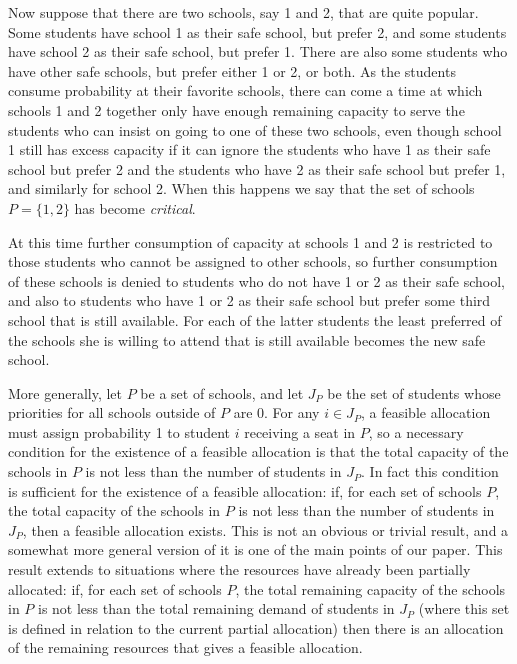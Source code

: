 \documentclass[12pt]{article}
\theoremstyle{definition}
\begin{document}
Now suppose that there are two schools, say 1 and 2, that are quite
popular.  Some students have school 1 as their safe school, but prefer
2, and some students have school 2 as their safe school, but prefer 1.
There are also some students who have other safe schools, but prefer
either 1 or 2, or both.  As the students consume probability at their
favorite schools, there can come a time at which schools 1 and 2
together only have enough remaining capacity to serve the students who
can insist on going to one of these two schools, even though school 1
still has excess capacity if it can ignore the students who have 1 as
their safe school but prefer 2 and the students who have 2 as their
safe school but prefer 1, and similarly for school 2.  When this
happens we say that the set of schools $P = \{1,2\}$ has become
\emph{critical}.

At this time further consumption of capacity at schools 1 and 2 is
restricted to those students who cannot be assigned to other schools,
so further consumption of these schools is denied to students who do
not have 1 or 2 as their safe school, and also to students who have 1
or 2 as their safe school but prefer some third school that is still
available.  For each of the latter students the least preferred of the
schools she is willing to attend that is still available becomes the
new safe school.

More generally, let $P$ be a set of schools, and let $J_P$ be the set
of students whose priorities for all schools outside of $P$ are 0.
For any $i \in J_P$, a feasible allocation must assign probability 1
to student $i$ receiving a seat in $P$, so a necessary condition for
the existence of a feasible allocation is that the total capacity of
the schools in $P$ is not less than the number of students in $J_P$.
In fact this condition is sufficient for the existence of a feasible
allocation: if, for each set of schools $P$, the total capacity of the
schools in $P$ is not less than the number of students in $J_P$, then
a feasible allocation exists.  This is not an obvious or trivial
result, and a somewhat more general version of it is one of the main
points of our paper.  This result extends to situations where the
resources have already been partially allocated: if, for each set of
schools $P$, the total remaining capacity of the schools in $P$ is not
less than the total remaining demand of students in $J_P$ (where this
set is defined in relation to the current partial allocation) then
there is an allocation of the remaining resources that gives a
feasible allocation.
\end{document}
